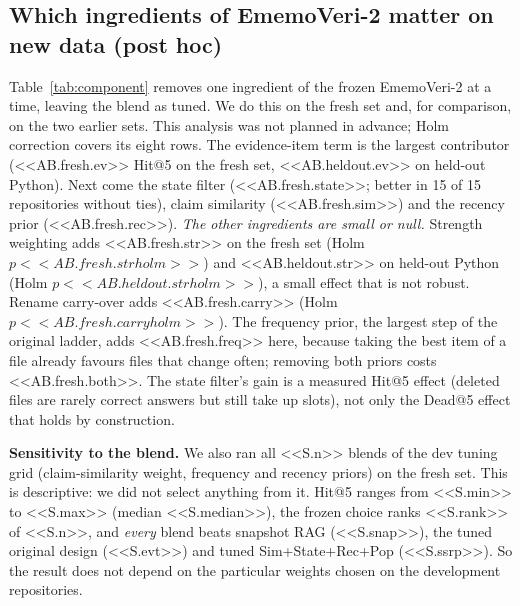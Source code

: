 \documentclass[conference]{IEEEtran}
\newcommand{\sys}{EmemoVeri}
\begin{document}
\subsection{Which ingredients of \sys{}-2 matter on new data (post hoc)}
\label{sec:component}
Table~\ref{tab:component} removes one ingredient of the frozen \sys{}-2 at a time, leaving the blend as tuned. We do this on the fresh set and, for comparison, on the two earlier sets. This analysis was not planned in advance; Holm correction covers its eight rows. The evidence-item term is the largest contributor (<<AB.fresh.ev>> Hit@5 on the fresh set, <<AB.heldout.ev>> on held-out Python). Next come the state filter (<<AB.fresh.state>>; better in 15 of 15 repositories without ties), claim similarity (<<AB.fresh.sim>>) and the recency prior (<<AB.fresh.rec>>). \emph{The other ingredients are small or null.} Strength weighting adds <<AB.fresh.str>> on the fresh set (Holm $p<<AB.fresh.strholm>>$) and <<AB.heldout.str>> on held-out Python (Holm $p<<AB.heldout.strholm>>$), a small effect that is not robust. Rename carry-over adds <<AB.fresh.carry>> (Holm $p<<AB.fresh.carryholm>>$). The frequency prior, the largest step of the original ladder, adds <<AB.fresh.freq>> here, because taking the best item of a file already favours files that change often; removing both priors costs <<AB.fresh.both>>. The state filter's gain is a measured Hit@5 effect (deleted files are rarely correct answers but still take up slots), not only the Dead@5 effect that holds by construction.

\textbf{Sensitivity to the blend.} We also ran all <<S.n>> blends of the dev tuning grid (claim-similarity weight, frequency and recency priors) on the fresh set. This is descriptive: we did not select anything from it. Hit@5 ranges from <<S.min>> to <<S.max>> (median <<S.median>>), the frozen choice ranks <<S.rank>> of <<S.n>>, and \emph{every} blend beats snapshot RAG (<<S.snap>>), the tuned original design (<<S.evt>>) and tuned Sim+State+Rec+Pop (<<S.ssrp>>). So the result does not depend on the particular weights chosen on the development repositories.

\begin{table}[t]\centering\footnotesize\setlength{\tabcolsep}{4pt}
\resizebox{0.97\textwidth}{!}{}
\caption{Component analysis of the frozen \sys{}-2 on new data: Hit@5 lost when one ingredient is removed (full minus variant; positive means the ingredient helps). Unit: repository; Holm correction over the eight rows. Rename carry-over needs a separate replay and was run on the fresh set only.}
\label{tab:component}
\end{table}
\end{document}
